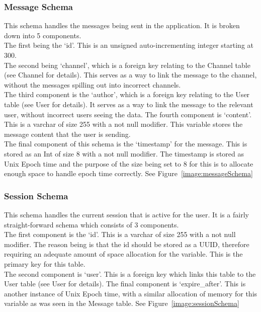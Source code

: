 \subsubsection{Message Schema}
This schema handles the messages being sent in the application. It is broken down into 5 components.
\\The first being the ‘id’. This is an unsigned auto-incrementing integer starting at 300.
\\The second being ‘channel’, which is a foreign key relating to the Channel table (see Channel for details). This serves as a way to link the message to the channel, without the messages spilling out into incorrect channels.
\\The third component is the ‘author’, which is a foreign key relating to the User table (see User for details). It serves as a way to link the message to the relevant user, without incorrect users seeing the data.
The fourth component is ‘content’. This is a varchar of size 255 with a not null modifier. This variable stores the message content that the user is sending.
\\The final component of this schema is the ‘timestamp’ for the message. This is stored as an Int of size 8 with a not null modifier.  The timestamp is stored as Unix Epoch time and the purpose of the size being set to 8 for this is to allocate enough space to handle epoch time correctly.
See Figure~\ref{image:messageSchema}

\subsubsection{Session Schema}
This schema handles the current session that is active for the user. It is a fairly straight-forward schema which consists of 3 components.
\\ The first component is the ‘id’. This is a varchar of size 255 with a not null modifier. The reason being is that the id should be stored as a UUID, therefore requiring an adequate amount of space allocation for the variable. This is the primary key for this table.
\\ The second component is ‘user’. This is a foreign key which links this table to the User table (see User for details).
The final component is ‘expire\_after’. This is another instance of Unix Epoch time, with a similar allocation of memory for this variable as was seen in the Message table. 
See Figure~\ref{image:sessionSchema}

